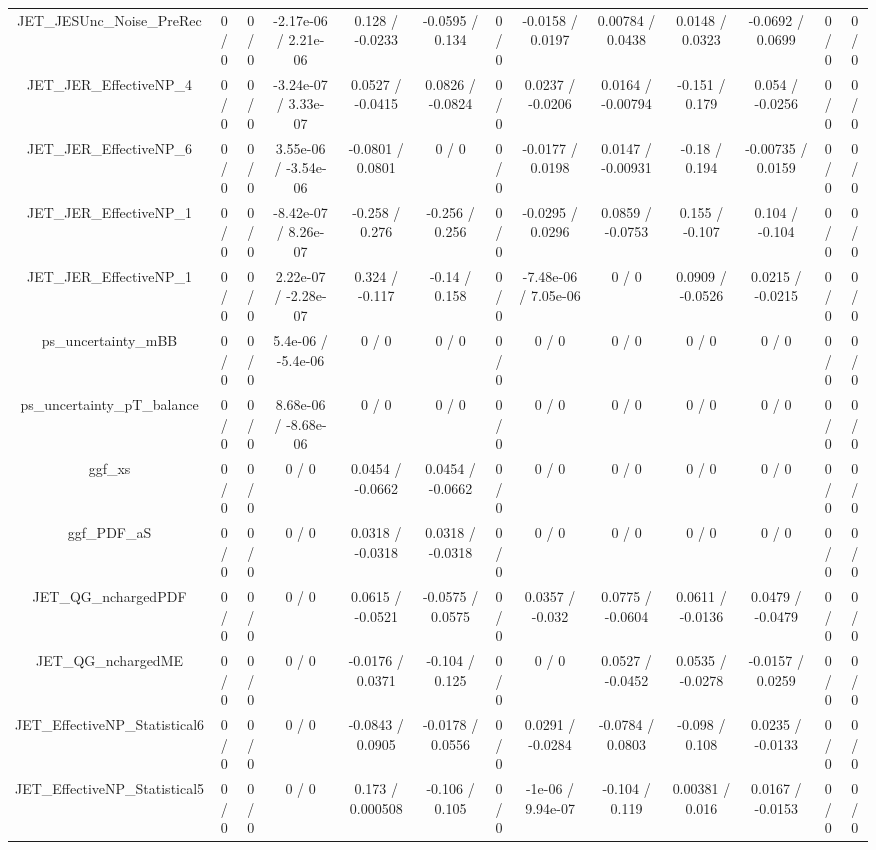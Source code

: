 \documentclass[10pt]{article}
\begin{document}
\begin{table}[htbp]
\begin{center}
\begin{tabular}{|c|c|c|c|c|c|c|c|c|c|c|c|c|}
  JET_JESUnc_Noise_PreRec & 0 / 0 & 0 / 0 & -2.17e-06 / 2.21e-06 & 0.128 / -0.0233 & -0.0595 / 0.134 & 0 / 0 & -0.0158 / 0.0197 & 0.00784 / 0.0438 & 0.0148 / 0.0323 & -0.0692 / 0.0699 & 0 / 0 & 0 / 0 \\ 
  JET_JER_EffectiveNP_4 & 0 / 0 & 0 / 0 & -3.24e-07 / 3.33e-07 & 0.0527 / -0.0415 & 0.0826 / -0.0824 & 0 / 0 & 0.0237 / -0.0206 & 0.0164 / -0.00794 & -0.151 / 0.179 & 0.054 / -0.0256 & 0 / 0 & 0 / 0 \\ 
  JET_JER_EffectiveNP_6 & 0 / 0 & 0 / 0 & 3.55e-06 / -3.54e-06 & -0.0801 / 0.0801 & 0 / 0 & 0 / 0 & -0.0177 / 0.0198 & 0.0147 / -0.00931 & -0.18 / 0.194 & -0.00735 / 0.0159 & 0 / 0 & 0 / 0 \\ 
  JET_JER_EffectiveNP_1 & 0 / 0 & 0 / 0 & -8.42e-07 / 8.26e-07 & -0.258 / 0.276 & -0.256 / 0.256 & 0 / 0 & -0.0295 / 0.0296 & 0.0859 / -0.0753 & 0.155 / -0.107 & 0.104 / -0.104 & 0 / 0 & 0 / 0 \\ 
  JET_JER_EffectiveNP_1 & 0 / 0 & 0 / 0 & 2.22e-07 / -2.28e-07 & 0.324 / -0.117 & -0.14 / 0.158 & 0 / 0 & -7.48e-06 / 7.05e-06 & 0 / 0 & 0.0909 / -0.0526 & 0.0215 / -0.0215 & 0 / 0 & 0 / 0 \\ 
  ps_uncertainty_mBB & 0 / 0 & 0 / 0 & 5.4e-06 / -5.4e-06 & 0 / 0 & 0 / 0 & 0 / 0 & 0 / 0 & 0 / 0 & 0 / 0 & 0 / 0 & 0 / 0 & 0 / 0 \\ 
  ps_uncertainty_pT_balance & 0 / 0 & 0 / 0 & 8.68e-06 / -8.68e-06 & 0 / 0 & 0 / 0 & 0 / 0 & 0 / 0 & 0 / 0 & 0 / 0 & 0 / 0 & 0 / 0 & 0 / 0 \\ 
  ggf_xs & 0 / 0 & 0 / 0 & 0 / 0 & 0.0454 / -0.0662 & 0.0454 / -0.0662 & 0 / 0 & 0 / 0 & 0 / 0 & 0 / 0 & 0 / 0 & 0 / 0 & 0 / 0 \\ 
  ggf_PDF_aS & 0 / 0 & 0 / 0 & 0 / 0 & 0.0318 / -0.0318 & 0.0318 / -0.0318 & 0 / 0 & 0 / 0 & 0 / 0 & 0 / 0 & 0 / 0 & 0 / 0 & 0 / 0 \\ 
  JET_QG_nchargedPDF & 0 / 0 & 0 / 0 & 0 / 0 & 0.0615 / -0.0521 & -0.0575 / 0.0575 & 0 / 0 & 0.0357 / -0.032 & 0.0775 / -0.0604 & 0.0611 / -0.0136 & 0.0479 / -0.0479 & 0 / 0 & 0 / 0 \\ 
  JET_QG_nchargedME & 0 / 0 & 0 / 0 & 0 / 0 & -0.0176 / 0.0371 & -0.104 / 0.125 & 0 / 0 & 0 / 0 & 0.0527 / -0.0452 & 0.0535 / -0.0278 & -0.0157 / 0.0259 & 0 / 0 & 0 / 0 \\ 
  JET_EffectiveNP_Statistical6 & 0 / 0 & 0 / 0 & 0 / 0 & -0.0843 / 0.0905 & -0.0178 / 0.0556 & 0 / 0 & 0.0291 / -0.0284 & -0.0784 / 0.0803 & -0.098 / 0.108 & 0.0235 / -0.0133 & 0 / 0 & 0 / 0 \\ 
  JET_EffectiveNP_Statistical5 & 0 / 0 & 0 / 0 & 0 / 0 & 0.173 / 0.000508 & -0.106 / 0.105 & 0 / 0 & -1e-06 / 9.94e-07 & -0.104 / 0.119 & 0.00381 / 0.016 & 0.0167 / -0.0153 & 0 / 0 & 0 / 0 \\ 

\end{tabular}
\end{center}
\end{table}
\end{document}
